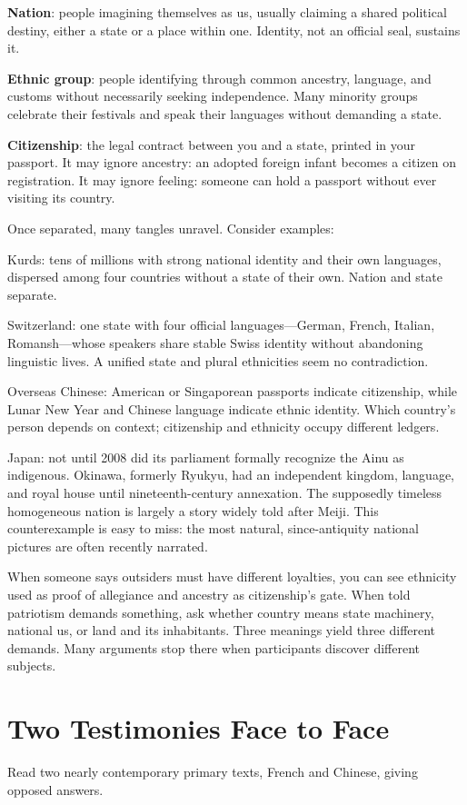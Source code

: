 \textbf{Nation}: people imagining themselves as us, usually claiming a shared political destiny, either a state or a place within one. Identity, not an official seal, sustains it.

\textbf{Ethnic group}: people identifying through common ancestry, language, and customs without necessarily seeking independence. Many minority groups celebrate their festivals and speak their languages without demanding a state.

\textbf{Citizenship}: the legal contract between you and a state, printed in your passport. It may ignore ancestry: an adopted foreign infant becomes a citizen on registration. It may ignore feeling: someone can hold a passport without ever visiting its country.

Once separated, many tangles unravel. Consider examples:

Kurds: tens of millions with strong national identity and their own languages, dispersed among four countries without a state of their own. Nation and state separate.

Switzerland: one state with four official languages---German, French, Italian, Romansh---whose speakers share stable Swiss identity without abandoning linguistic lives. A unified state and plural ethnicities seem no contradiction.

Overseas Chinese: American or Singaporean passports indicate citizenship, while Lunar New Year and Chinese language indicate ethnic identity. Which country's person depends on context; citizenship and ethnicity occupy different ledgers.

Japan: not until 2008 did its parliament formally recognize the Ainu as indigenous. Okinawa, formerly Ryukyu, had an independent kingdom, language, and royal house until nineteenth-century annexation. The supposedly timeless homogeneous nation is largely a story widely told after Meiji. This counterexample is easy to miss: the most natural, since-antiquity national pictures are often recently narrated.

When someone says outsiders must have different loyalties, you can see ethnicity used as proof of allegiance and ancestry as citizenship's gate. When told patriotism demands something, ask whether country means state machinery, national us, or land and its inhabitants. Three meanings yield three different demands. Many arguments stop there when participants discover different subjects.

\section{Two Testimonies Face to Face}
Read two nearly contemporary primary texts, French and Chinese, giving opposed answers.

